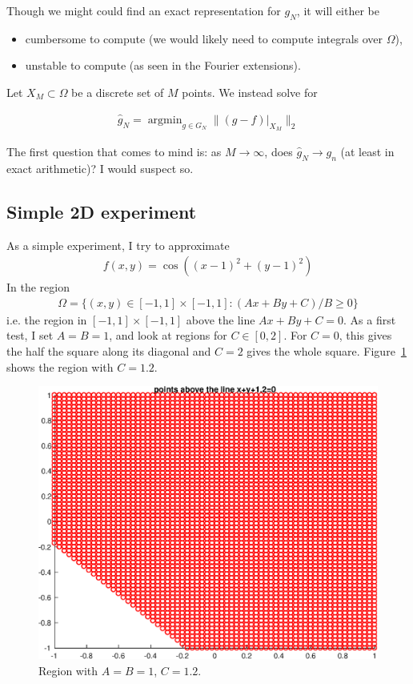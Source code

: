 \documentclass{article}
\DeclareMathOperator*{\argmin}{argmin}
\begin{document}
Though we might could find an exact representation for $g_N$, it will either be
\begin{itemize}
\item cumbersome to compute (we would likely need to compute integrals over $\Omega$),
\item unstable to compute (as seen in the Fourier extensions).
\end{itemize}

Let $X_M \subset \Omega$ be a discrete set of $M$ points. We instead solve for

\begin{align}
\hat{g}_N = \argmin_{g \in G_N} \| \left . (g-f) \right |_{X_M} \|_2
\end{align}

The first question that comes to mind is: as $M \to \infty$, does $\hat{g}_N \to g_n$ (at least in exact arithmetic)? I would suspect so.

\subsection{Simple 2D experiment}

As a simple experiment, I try to approximate
\begin{align}
f(x,y) = \cos((x-1)^2+(y-1)^2)
\end{align}
In the region
\begin{align}
\Omega = \{(x,y) \in [-1,1] \times [-1,1]: (Ax+By+C)/B \geq 0 \}
\label{trig_region}
\end{align}
i.e. the region in $[-1,1] \times [-1,1]$ above the line $Ax+By+C=0$. As a first test, I set $A=B=1$, and look at regions for $C \in [0,2]$. For $C=0$, this gives the half the square along its diagonal and $C=2$ gives the whole square. Figure~\ref{region_c} shows the region with $C=1.2$.
\begin{figure}[!h]
\centering
\includegraphics[scale = 0.5]{subset_plot.eps}
\caption{Region with $A=B=1$, $C=1.2$.}
\label{region_c}
\end{figure}
\end{document}
